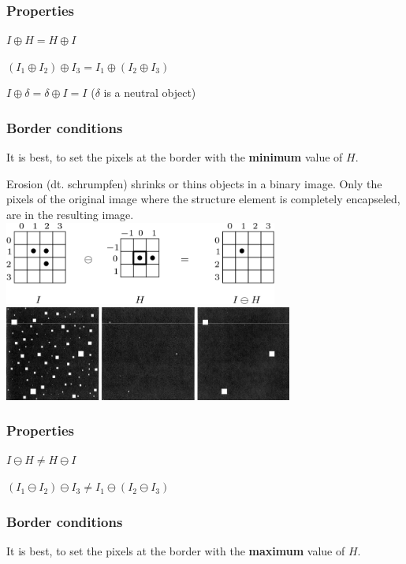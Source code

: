   \begin{minipage}{9.5cm}
    \subsubsection{Properties}
    \begin{liste}
      \item $I \oplus H = H \oplus I$
      \item $(I_1 \oplus I_2) \oplus I_3 = I_1 \oplus (I_2 \oplus I_3)$
      \item $I \oplus \delta = \delta \oplus I = I$ ($\delta$ is a neutral object)
    \end{liste}
  \end{minipage}
  \begin{minipage}{9.5cm}
    \subsubsection{Border conditions}
      It is best, to set the pixels at the border with the \textbf{minimum} value of $H$.
  \end{minipage} 

  Erosion (dt. schrumpfen) shrinks or thins objects in a binary image. Only the pixels of the 
  original image where the structure element is completely encapseled, are in the resulting image.\\
  \includegraphics[width=9cm]{./images/erosion.png} 
  \hspace{0.5cm}
  \includegraphics[width=9.5cm]{./images/erosion_example.png}
  \begin{minipage}{9.5cm}
    \subsubsection{Properties}
    \begin{liste}
      \item $I \ominus H \neq H \ominus I$
      \item $(I_1 \ominus I_2) \ominus I_3 \neq I_1 \ominus (I_2 \ominus I_3)$
    \end{liste}
  \end{minipage}
  \begin{minipage}{9.5cm}
    \subsubsection{Border conditions}
      It is best, to set the pixels at the border with the \textbf{maximum} value of $H$.
  \end{minipage}
  
